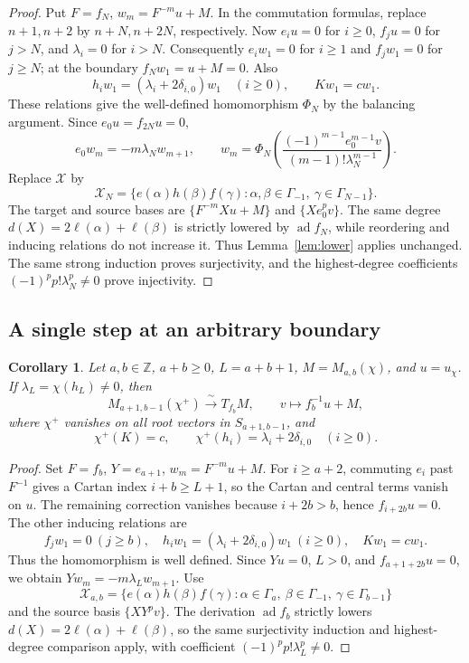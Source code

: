 \documentclass[11pt]{article}
\newcommand{\Z}{\mathbb Z}
\newcommand{\ad}{\operatorname{ad}}
\newtheorem{corollary}[theorem]{Corollary}
\begin{document}
\begin{proof}
Put \(F=f_N\), \(w_m=F^{-m}u+M\). In the commutation formulas, replace
\(n+1,n+2\) by \(n+N,n+2N\), respectively. Now
\(e_iu=0\) for \(i\ge0\), \(f_ju=0\) for \(j>N\), and
\(\lambda_i=0\) for \(i>N\).
Consequently \(e_iw_1=0\) for \(i\ge1\) and \(f_jw_1=0\) for \(j\ge N\);
at the boundary \(f_Nw_1=u+M=0\). Also
\[
 h_iw_1=(\lambda_i+2\delta_{i,0})w_1\quad(i\ge0),\qquad Kw_1=cw_1.
\]
These relations give the well-defined homomorphism \(\Phi_N\) by the
balancing argument. Since \(e_0u=f_{2N}u=0\),
\[
 e_0w_m=-m\lambda_Nw_{m+1},\qquad
 w_m=\Phi_N\left(\frac{(-1)^{m-1}e_0^{m-1}v}
                         {(m-1)!\lambda_N^{m-1}}\right).
\]
Replace \(\mathcal X\) by
\[
 \mathcal X_N=\{e(\alpha)h(\beta)f(\gamma):
      \alpha,\beta\in\Gamma_{-1},\ \gamma\in\Gamma_{N-1}\}.
\]
The target and source bases are \(\{F^{-m}Xu+M\}\) and \(\{Xe_0^pv\}\).
The same degree \(d(X)=2\ell(\alpha)+\ell(\beta)\) is strictly lowered by
\(\ad f_N\), while reordering and inducing relations do not increase it.
Thus Lemma~\ref{lem:lower} applies unchanged. The same strong induction
proves surjectivity, and the highest-degree coefficients
\((-1)^pp!\lambda_N^p\ne0\) prove injectivity.
\end{proof}

\subsection{A single step at an arbitrary boundary}

\begin{corollary}\label{cor:general}
Let \(a,b\in\Z\), \(a+b\ge0\), \(L=a+b+1\), \(M=M_{a,b}(\chi)\),
and \(u=u_\chi\). If \(\lambda_L=\chi(h_L)\ne0\), then
\[
 M_{a+1,b-1}(\chi^+)\xrightarrow{\ \sim\ }T_{f_b}M,\qquad
 v\longmapsto f_b^{-1}u+M,
\]
where \(\chi^+\) vanishes on all root vectors in \(S_{a+1,b-1}\), and
\[
 \chi^+(K)=c,\qquad \chi^+(h_i)=\lambda_i+2\delta_{i,0}\quad(i\ge0).
\]
\end{corollary}

\begin{proof}
Set \(F=f_b\), \(Y=e_{a+1}\), \(w_m=F^{-m}u+M\).
For \(i\ge a+2\), commuting \(e_i\) past \(F^{-1}\) gives a Cartan index
\(i+b\ge L+1\), so the Cartan and central terms vanish on \(u\).
The remaining correction vanishes because \(i+2b>b\), hence
\(f_{i+2b}u=0\).
The other inducing relations are
\[
 f_jw_1=0\ (j\ge b),\quad
 h_iw_1=(\lambda_i+2\delta_{i,0})w_1\ (i\ge0),\quad Kw_1=cw_1.
\]
Thus the homomorphism is well defined. Since \(Yu=0\), \(L>0\), and
\(f_{a+1+2b}u=0\), we obtain \(Yw_m=-m\lambda_Lw_{m+1}\).
Use
\[
 \mathcal X_{a,b}=\{e(\alpha)h(\beta)f(\gamma):
    \alpha\in\Gamma_a,\ \beta\in\Gamma_{-1},\ \gamma\in\Gamma_{b-1}\}
\]
and the source basis \(\{XY^pv\}\).
The derivation \(\ad f_b\) strictly lowers
\(d(X)=2\ell(\alpha)+\ell(\beta)\), so the same surjectivity induction and
highest-degree comparison apply, with coefficient
\((-1)^pp!\lambda_L^p\ne0\).
\end{proof}
\end{document}
